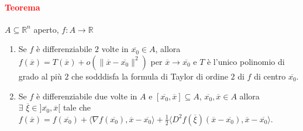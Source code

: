 \documentclass{article}
\newcommand{\R}{\mathbb{R}}
\begin{document}
\paragraph{\textcolor{red}{Teorema}}
$A \subseteq \R^n$ aperto, $f: A \rightarrow \R$
\begin{enumerate}
    \item Se $f$ è differenziabile $2$ volte in $\overline{x_0} \in A$, allora $f(\overline{x})=T(\overline{x})+o(\|\overline{x}-\overline{x_0}\|^2)$ per $\overline{x}\rightarrow \overline{x_0}$ e $T$ è l'unico polinomio di grado al più $2$ che sodddisfa  la formula di Taylor di ordine $2$ di $f$ di centro $\overline{x_0}$.
    \item Se $f$ è differenziabile due volte in $A$ e $[\overline{x_0},\overline{x}]\subseteq A$, $\overline{x_0},\overline{x}\in A$ allora $ \exists\,\, \overline{\xi}\in ]\overline{x_0},\overline{x}[$ tale che $f(\overline{x})=f(\overline{x_0})+\langle \nabla f(\overline{x_0}),\overline{x} -\overline{x_0}\rangle +\frac{1}{2}\langle D^2 f(\overline{\xi})(\overline{x}-\overline{x_0}),\overline{x}-\overline{x_0} \rangle$.
\end{enumerate} 
\end{document}
